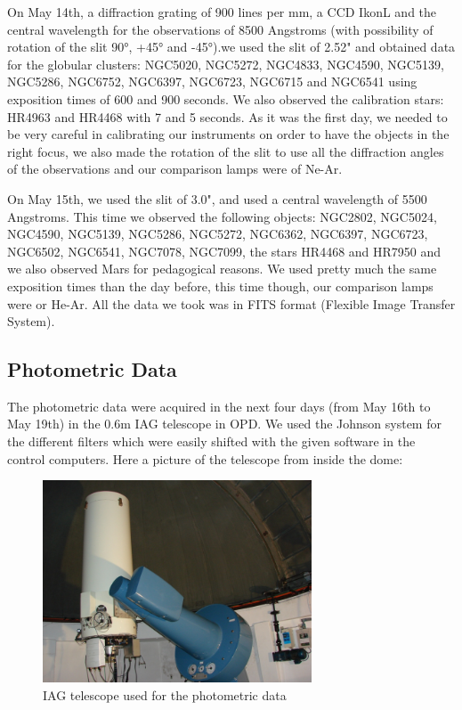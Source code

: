 On May 14th, a diffraction grating of 900 lines per mm, a CCD IkonL and the central wavelength for the observations of 8500 Angstroms (with possibility of rotation of the slit 90°, +45° and -45°).we used the slit of 2.52" and obtained data for the globular clusters: NGC5020, NGC5272, NGC4833, NGC4590, NGC5139, NGC5286, NGC6752, NGC6397, NGC6723, NGC6715 and NGC6541 using exposition times of 600 and 900 seconds. We also observed the calibration stars: HR4963 and HR4468 with 7 and 5 seconds. As it was the first day, we needed to be very careful in calibrating our instruments on order to have the objects in the right focus, we also made the rotation of the slit to use all the diffraction angles of the observations and our comparison lamps were of Ne-Ar.

On May 15th, we used the slit of 3.0", and used a central wavelength of 5500 Angstroms. This time we observed the following objects: NGC2802, NGC5024, NGC4590, NGC5139, NGC5286, NGC5272, NGC6362, NGC6397, NGC6723, NGC6502, NGC6541, NGC7078, NGC7099, the stars HR4468 and HR7950 and we also observed Mars for pedagogical reasons. We used pretty much the same exposition times than the day before, this time though, our comparison lamps were or He-Ar. All the data we took was in FITS format (Flexible Image Transfer System).

\subsection{Photometric Data}

The photometric data were acquired in the next four days (from May 16th to May 19th) in the 0.6m IAG telescope in OPD. We used the Johnson system for the different filters which were easily shifted with the given software in the control computers. Here a picture of the telescope from inside the dome:

\begin{figure}[H]
\centering
\includegraphics[width=8cm]{images/opd-photometry.jpg}
\caption[IAG Telescope used for Photometry]{IAG telescope used for the photometric data}
\end{figure}

